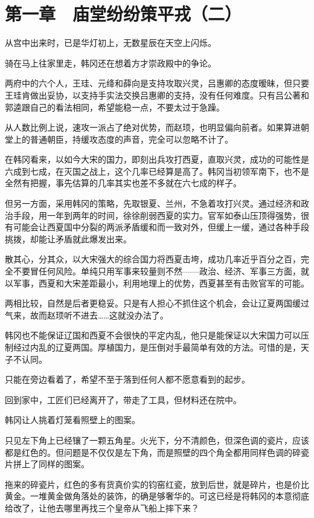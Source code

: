 \section{第一章　庙堂纷纷策平戎（二）}

从宫中出来时，已是华灯初上，无数星辰在天空上闪烁。

骑在马上往家里走，韩冈还在想着方才崇政殿中的争论。

两府中的六个人，王珪、元绛和薛向是支持攻取兴灵，吕惠卿的态度暧昧，但只要王珪肯做出妥协，以支持手实法交换吕惠卿的支持，没有任何难度。只有吕公著和郭逵跟自己的看法相同，希望能稳一点，不要太过于急躁。

从人数比例上说，速攻一派占了绝对优势，而赵顼，也明显偏向前者。如果算进朝堂上的普通朝臣，持缓攻态度的声音，完全可以忽略不计了。

在韩冈看来，以如今大宋的国力，即刻出兵攻打西夏，直取兴灵，成功的可能性是六成到七成，在灭国之战上，这个几率已经算是高了。韩冈当初领军南下，也不是全然有把握，事先估算的几率其实也差不多就在六七成的样子。

但另一方面，采用韩冈的策略，先取银夏、兰州，不急着攻打兴灵。通过经济和政治手段，用一年到两年的时间，徐徐削弱西夏的实力。官军如泰山压顶得强势，很有可能会让西夏国中分裂的两派矛盾缓和而一致对外，但缓上一缓，通过各种手段挑拨，却能让矛盾就此爆发出来。

散其心，分其众，以大宋强大的综合国力将西夏击垮，成功几率近乎百分之百，完全不要冒任何风险。单纯只用军事来较量则不然——政治、经济、军事三方面，就以军事，西夏和大宋差距最小，利用地理上的优势，西夏甚至有击败官军的可能。

两相比较，自然是后者更稳妥。只是有人担心不抓住这个机会，会让辽夏两国缓过气来，故而赵顼听不进去……这就没办法了。

韩冈也不能保证辽国和西夏不会很快的平定内乱，他只是能保证以大宋国力可以压制经过内乱的辽夏两国。厚植国力，是压倒对手最简单有效的方法。可惜的是，天子不认同。

只能在旁边看着了，希望不至于落到任何人都不愿意看到的起步。

回到家中，工匠们已经离开了，带走了工具，但材料还在院中。

韩冈让人挑着灯笼看照壁上的图案。

只见左下角上已经镶了一颗五角星。火光下，分不清颜色，但深色调的瓷片，应该都是红色的。但问题是不仅仅是左下角，而是照壁的四个角全都用同样色调的碎瓷片拼上了同样的图案。

拖来的碎瓷片，红色的多有货真价实的钧窑红瓷，放到后世，就是碎片，也是价比黄金。一堆黄金做角落处的装饰，的确是够奢华的。可这已经是将韩冈的本意彻底给改了，让他去哪里再找三个皇帝从飞船上摔下来？

